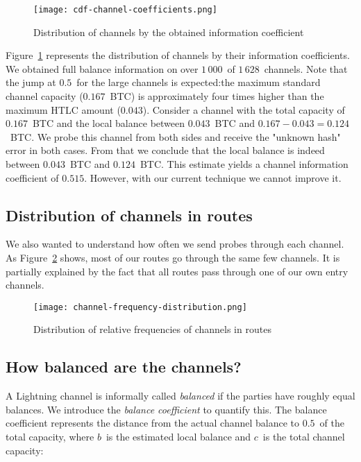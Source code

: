 \begin{figure}[ht]
	\centering
	\texttt{[image: cdf-channel-coefficients.png]}
	\caption{Distribution of channels by the obtained information coefficient}
	\label{fig:cdf-channel-coefficients}
\end{figure}

Figure~\ref{fig:cdf-channel-coefficients} represents the distribution of channels by their information coefficients.
We obtained full balance information on over $1\,000$~of $1\,628$~channels.
Note that the jump at $0.5$~for the large channels is expected:the maximum standard channel capacity ($0.167$~BTC) is approximately four times higher than the maximum HTLC amount ($0.043$).
Consider a channel with the total capacity of $0.167$~BTC and the local balance between $0.043$~BTC and $0.167 - 0.043 = 0.124$~BTC\@.
We probe this channel from both sides and receive the "unknown hash" error in both cases.
From that we conclude that the local balance is indeed between $0.043$~BTC and $0.124$~BTC\@.
This estimate yields a channel information coefficient of $0.515$.
However, with our current technique we cannot improve it.

\subsection{Distribution of channels in routes}

We also wanted to understand how often we send probes through each channel.
As Figure~\ref{fig:channel-frequency-distribution} shows, most of our routes go through the same few channels.
It is partially explained by the fact that all routes pass through one of our own entry channels.

\begin{figure}[h]
	\centering
	\texttt{[image: channel-frequency-distribution.png]}
	\caption{Distribution of relative frequencies of channels in routes}
	\label{fig:channel-frequency-distribution}
\end{figure}


\subsection{How balanced are the channels?}

A Lightning channel is informally called \textit{balanced} if the parties have roughly equal balances.
We introduce the \textit{balance coefficient} to quantify this.
The balance coefficient represents the distance from the actual channel balance to $0.5$~of the total capacity, where $b$~is the estimated local balance and $c$~is the total channel capacity:


